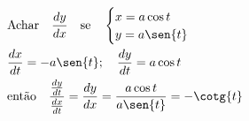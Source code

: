 \begin{ex}
\begin{align}
&\text{Achar} \quad \frac{dy}{dx}\quad\text{se}\quad \begin{cases} x=a\cos{t}\\y=a\sen{t}\end{cases}\nonumber\\
&\frac{dx}{dt}=-a\sen{t};\quad \frac{dy}{dt} = a\cos{t}\nonumber\\
&\text{então}\quad \frac{\frac{dy}{dt}}{\frac{dx}{dt}}=\frac{dy}{dx}=\frac{a\cos{t}}{a\sen{t}}=-\cotg{t}\nonumber
\end{align}
\end{ex}